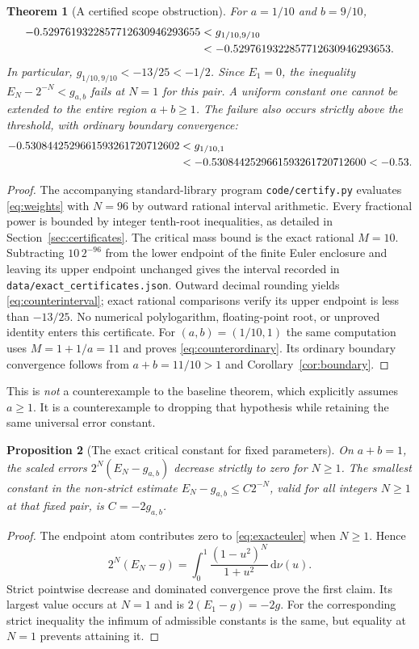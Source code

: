 \documentclass[11pt]{article}
\numberwithin{equation}{section}
\newtheorem{theorem}{Theorem}[section]
\newtheorem{proposition}[theorem]{Proposition}
\theoremstyle{definition}\newtheorem{definition}[theorem]{Definition}
\theoremstyle{remark}\newtheorem{remark}[theorem]{Remark}
\newcommand{\dd}{\,\mathrm d}
\begin{document}
\begin{theorem}[A certified scope obstruction]\label{thm:counterexample}
For $a=1/10$ and $b=9/10$,
\begin{align}\label{eq:counterinterval}
 -0.5297619322857712630946293655
 &<g_{1/10,9/10}\notag\\
 &<-0.5297619322857712630946293653.
\end{align}
In particular, $g_{1/10,9/10}<-13/25<-1/2$.
Since $E_1=0$, the inequality $E_N-2^{-N}<g_{a,b}$ fails at $N=1$
for this pair. A uniform constant one cannot be extended to the
entire region $a+b\ge1$. The failure also occurs strictly above
the threshold, with ordinary boundary convergence:
\begin{align}\label{eq:counterordinary}
 -0.5308442529661593261720712602
 &<g_{1/10,1}\notag\\
 &<-0.5308442529661593261720712600<-0.53.
\end{align}
\end{theorem}
\begin{proof}
The accompanying standard-library program \texttt{code/certify.py}
evaluates \eqref{eq:weights} with $N=96$ by outward rational interval
arithmetic. Every fractional power is bounded by integer tenth-root
inequalities, as detailed in Section~\ref{sec:certificates}. The
critical mass bound is the exact rational $M=10$. Subtracting
$10\,2^{-96}$ from the lower endpoint of the finite Euler enclosure
and leaving its upper endpoint unchanged gives the interval recorded
in \texttt{data/exact\_certificates.json}. Outward decimal rounding
yields \eqref{eq:counterinterval}; exact rational comparisons verify
its upper endpoint is less than $-13/25$. No numerical polylogarithm,
floating-point root, or unproved identity enters this certificate.
For $(a,b)=(1/10,1)$ the same computation uses $M=1+1/a=11$
and proves \eqref{eq:counterordinary}. Its ordinary boundary
convergence follows from $a+b=11/10>1$ and
Corollary~\ref{cor:boundary}.
\end{proof}

This is \emph{not} a counterexample to the baseline theorem, which
explicitly assumes $a\ge1$. It is a counterexample to dropping that
hypothesis while retaining the same universal error constant.

\begin{proposition}[The exact critical constant for fixed parameters]
\label{prop:fixedconstant}
On $a+b=1$, the scaled errors $2^N(E_N-g_{a,b})$ decrease strictly
to zero for $N\ge1$. The smallest constant in the non-strict estimate
$E_N-g_{a,b}\le C2^{-N}$, valid for all integers $N\ge1$ at that fixed
pair, is $C=-2g_{a,b}$.
\end{proposition}
\begin{proof}
The endpoint atom contributes zero to \eqref{eq:exacteuler} when
$N\ge1$. Hence
\[
 2^N(E_N-g)=\int_0^1\frac{(1-u^2)^N}{1+u^2}\dd\nu(u).
\]
Strict pointwise decrease and dominated convergence prove the first
claim. Its largest value occurs at $N=1$ and is $2(E_1-g)=-2g$.
For the corresponding strict inequality the infimum of admissible
constants is the same, but equality at $N=1$ prevents attaining it.
\end{proof}
\end{document}
